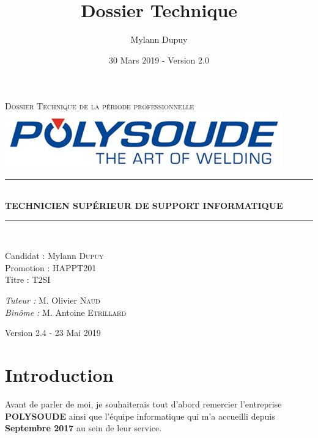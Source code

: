 \documentclass[11pt,a4paper,oneside]{article}
\author{Mylann Dupuy}
\title{Dossier Technique}
\date{30 Mars 2019 - Version 2.0}
\newcommand{\HRule}{\rule{\linewidth}{0.5mm}}
\begin{document}
\begin{titlepage}
  \begin{sffamily}
  \begin{center}

    \textsc{\LARGE Dossier Technique de la période professionnelle}\\[6.5cm]
    \includegraphics[scale=1]{Ressources/polysoude.jpg}
        \HRule \\[0.4cm]
        { \huge \bfseries TECHNICIEN SUPÉRIEUR DE SUPPORT INFORMATIQUE\\[0.4cm] }
        \HRule \\[6.5cm]

    \begin{minipage}{0.4\textwidth}
      \begin{flushleft} \large
        Candidat : Mylann \textsc{Dupuy}\\
        Promotion : HAPPT201\\
        Titre : T2SI
      \end{flushleft}
    \end{minipage}
    \begin{minipage}{0.5\textwidth}
      \begin{flushright} \large
        \emph{Tuteur :} M. Olivier \textsc{Naud}\\
        \emph{Binôme :} M. Antoine \textsc{Etrillard}\\
      \end{flushright}
    \end{minipage}

    \vfill

    {\large Version 2.4 - 23 Mai 2019}

  \end{center}
  \end{sffamily}
\end{titlepage}
\newpage

\tableofcontents
\newpage
\setcounter{page}{2}
\newpage

\section*{Introduction}
Avant de parler de moi, je souhaiterais tout d’abord remercier l’entreprise \textbf{POLYSOUDE} ainsi que l'équipe informatique qui m’a accueilli depuis \textbf{Septembre 2017} au sein de leur service.
\end{document}
